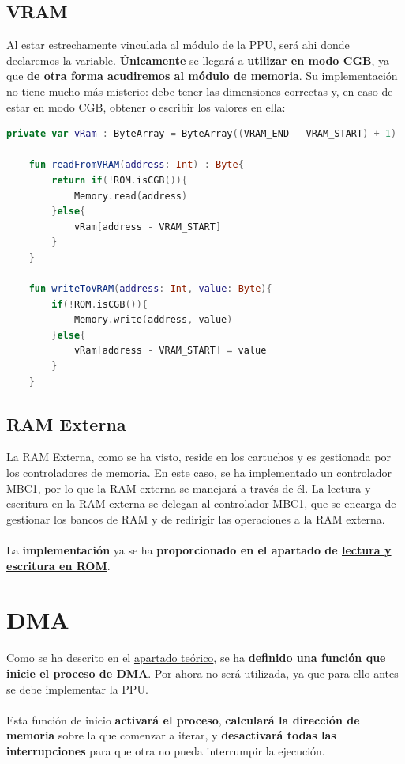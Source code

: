 \subsection{VRAM}

Al estar estrechamente vinculada al módulo de la PPU, será ahi donde declaremos la variable. \textbf{Únicamente} se llegará a \textbf{utilizar en modo CGB}, ya que \textbf{de otra forma acudiremos al módulo de memoria}. Su implementación no tiene mucho más misterio: debe tener las dimensiones correctas y, en caso de estar en modo CGB, obtener o escribir los valores en ella:
\clearpage
\begin{lstlisting}[language=Kotlin, caption={Lectura y escritura en Video RAM.}, label={code:vramreadwrite}]
    private var vRam : ByteArray = ByteArray((VRAM_END - VRAM_START) + 1)

    fun readFromVRAM(address: Int) : Byte{
        return if(!ROM.isCGB()){
            Memory.read(address)
        }else{
            vRam[address - VRAM_START]
        }
    }

    fun writeToVRAM(address: Int, value: Byte){
        if(!ROM.isCGB()){
            Memory.write(address, value)
        }else{
            vRam[address - VRAM_START] = value
        }
    }
\end{lstlisting}

\subsection{RAM Externa}

La RAM Externa, como se ha visto, reside en los cartuchos y es gestionada por los controladores de memoria. En este caso, se ha implementado un controlador MBC1, por lo que la RAM externa se manejará a través de él. La lectura y escritura en la RAM externa se delegan al controlador MBC1, que se encarga de gestionar los bancos de RAM y de redirigir las operaciones a la RAM externa.
\\\\
La \textbf{implementación} ya se ha \textbf{proporcionado en el apartado de \hyperref[rom:read_write]{lectura y escritura en ROM}}.

\section{DMA}

Como se ha descrito en el \hyperref[dma]{apartado teórico}, se ha \textbf{definido una función que inicie el proceso de DMA}. Por ahora no será utilizada, ya que para ello antes se debe implementar la PPU.
\\\\
Esta función de inicio \textbf{activará el proceso}, \textbf{calculará la dirección de memoria} sobre la que comenzar a iterar, y \textbf{desactivará todas las interrupciones} para que otra no pueda interrumpir la ejecución.

